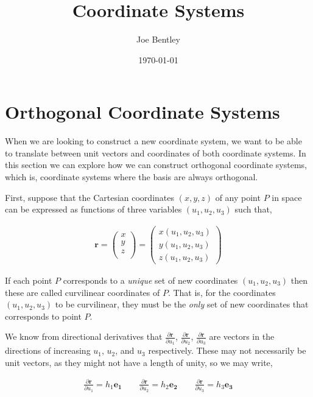 \documentclass[11pt]{amsart}
\title{Coordinate Systems}
\author{Joe Bentley}
\date{\today}
\begin{document}
\maketitle

\newpage

\section{Orthogonal Coordinate Systems}

When we are looking to construct a new coordinate system, we want to be able to translate between unit vectors and coordinates of both coordinate systems. In this section we can explore how we can construct orthogonal coordinate systems, which is, coordinate systems where the basis are always orthogonal.

First, suppose that the Cartesian coordinates $(x, y, z)$ of any point $P$ in space can be expressed as functions of three variables $(u_1, u_2, u_3)$ such that,

\begin{align*}
  \mathbf{r} =
  \begin{pmatrix}
    x \\
    y \\
    z \\
  \end{pmatrix} =
  \begin{pmatrix}
    x(u_1, u_2, u_3) \\
    y(u_1, u_2, u_3) \\
    z(u_1, u_2, u_3)
  \end{pmatrix}
\end{align*}

If each point $P$ corresponds to a \textit{unique} set of new coordinates $(u_1, u_2, u_3)$ then these are called curvilinear coordinates of $P$. That is, for the coordinates $(u_1, u_2, u_3)$ to be curvilinear, they must be the \textit{only} set of new coordinates that corresponds to point $P$.

We know from directional derivatives that $\frac{\partial\mathbf{r}}{\partial u_1}$, $\frac{\partial\mathbf{r}}{\partial u_2}$, $\frac{\partial\mathbf{r}}{\partial u_3}$ are vectors in the directions of increasing $u_1$, $u_2$, and $u_3$ respectively. These may not necessarily be unit vectors, as they might not have a length of unity, so we may write,

\begin{align*}
   \frac{\partial\mathbf{r}}{\partial u_1} = h_1 \mathbf{e_1} \qquad \frac{\partial\mathbf{r}}{\partial u_2} = h_2 \mathbf{e_2} \qquad \frac{\partial\mathbf{r}}{\partial u_3} = h_3 \mathbf{e_3}
\end{align*}
\end{document}

